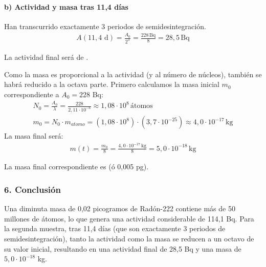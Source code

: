 \paragraph*{b) Actividad y masa tras 11,4 días}
Han transcurrido exactamente 3 periodos de semidesintegración.
\begin{gather}
    A(11,4 \text{ d}) = \frac{A_0}{2^3} = \frac{228 \, \text{Bq}}{8} = 28,5 \, \text{Bq}
\end{gather}
\begin{cajaresultado}
    La actividad final será de .
\end{cajaresultado}
Como la masa es proporcional a la actividad (y al número de núcleos), también se habrá reducido a la octava parte. Primero calculamos la masa inicial $m_0$ correspondiente a $A_0=228$ Bq:
\begin{gather}
    N_0 = \frac{A_0}{\lambda} = \frac{228}{2,11 \cdot 10^{-6}} \approx 1,08 \cdot 10^8 \, \text{átomos} \\
    m_0 = N_0 \cdot m_{atomo} = (1,08 \cdot 10^8) \cdot (3,7 \cdot 10^{-25}) \approx 4,0 \cdot 10^{-17} \, \text{kg}
\end{gather}
La masa final será:
\begin{gather}
    m(t) = \frac{m_0}{8} = \frac{4,0 \cdot 10^{-17} \, \text{kg}}{8} = 5,0 \cdot 10^{-18} \, \text{kg}
\end{gather}
\begin{cajaresultado}
    La masa final correspondiente es  (ó 0,005 pg).
\end{cajaresultado}

\subsubsection*{6. Conclusión}
\begin{cajaconclusion}
Una diminuta masa de 0,02 picogramos de Radón-222 contiene más de 50 millones de átomos, lo que genera una actividad considerable de 114,1 Bq. Para la segunda muestra, tras 11,4 días (que son exactamente 3 periodos de semidesintegración), tanto la actividad como la masa se reducen a un octavo de su valor inicial, resultando en una actividad final de 28,5 Bq y una masa de $5,0 \cdot 10^{-18}$ kg.
\end{cajaconclusion}
\newpage